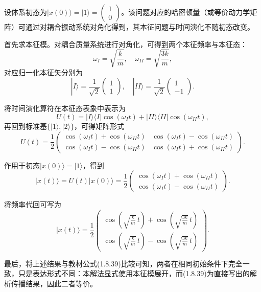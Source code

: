\begin{solution}[耦合质量问题]

\answer
设体系初态为$|x(0)\rangle=|1\rangle=\begin{pmatrix}1\\0\end{pmatrix}$。该问题对应的哈密顿量（或等价动力学矩阵）可通过对耦合振动系统对角化得到，其本征问题与时间演化不随初态改变。

首先求本征模。对耦合质量系统进行对角化，可得到两个本征频率与本征态：
\[
\omega_I=\sqrt{\frac{k}{m}},\quad \omega_{II}=\sqrt{\frac{3k}{m}},
\]
对应归一化本征矢分别为
\[
|I\rangle=\frac{1}{\sqrt{2}}\begin{pmatrix}1\\1\end{pmatrix},\quad
|II\rangle=\frac{1}{\sqrt{2}}\begin{pmatrix}1\\-1\end{pmatrix}.
\]

将时间演化算符在本征态表象中表示为
\[
U(t)=|I\rangle\langle I|\cos(\omega_I t)+|II\rangle\langle II|\cos(\omega_{II} t),
\]
再回到标准基$\{|1\rangle,|2\rangle\}$，可得矩阵形式
\[
U(t)=\frac{1}{2}
\begin{pmatrix}
\cos(\omega_I t)+\cos(\omega_{II} t) & \cos(\omega_I t)-\cos(\omega_{II} t)\\
\cos(\omega_I t)-\cos(\omega_{II} t) & \cos(\omega_I t)+\cos(\omega_{II} t)
\end{pmatrix}.
\]

作用于初态$|x(0)\rangle=|1\rangle$，得到
\[
|x(t)\rangle=U(t)|x(0)\rangle=
\frac{1}{2}
\begin{pmatrix}
\cos(\omega_I t)+\cos(\omega_{II} t)\\
\cos(\omega_I t)-\cos(\omega_{II} t)
\end{pmatrix}.
\]

将频率代回可写为
\[
|x(t)\rangle=
\frac{1}{2}
\begin{pmatrix}
\cos\!\left(\sqrt{\frac{k}{m}}\,t\right)+\cos\!\left(\sqrt{\frac{3k}{m}}\,t\right)\\[4pt]
\cos\!\left(\sqrt{\frac{k}{m}}\,t\right)-\cos\!\left(\sqrt{\frac{3k}{m}}\,t\right)
\end{pmatrix}.
\]

最后，将上述结果与教材公式(1.8.39)比较可知，两者在相同初始条件下完全一致，只是表达形式不同：本解法显式使用本征模展开，而(1.8.39)为直接写出的解析传播结果，因此二者等价。
\end{solution}


